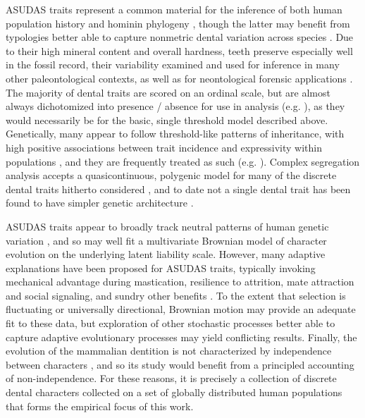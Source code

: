 \documentclass[10pt, twocolumn, twoside]{article}
\begin{document}
ASUDAS traits represent a common material for the inference of both human population history \citep{hubbardNuclearDNADental2015, rathmannReconstructingHumanPopulation2017, reyes-centenoTestingModernHuman2017} and hominin phylogeny \citep{irishDentalMorphologyPhylogenetic2013, irishAncientTeethPhenetic2018}, though the latter may benefit from typologies better able to capture nonmetric dental variation across species \citep{baileyNeandertalDentalMorphology2002, carterNewsViewsNonmetric2014}. Due to their high mineral content and overall hardness, teeth preserve especially well in the fossil record, their variability examined and used for inference in many other paleontological contexts, as well as for neontological forensic applications \citep{scottRASUDASNewWebbased2018}. The majority of dental traits are scored on an ordinal scale, but are almost always dichotomized into presence / absence for use in analysis (e.g. \citealt{irishDentalMorphologyPhylogenetic2013}), as they would necessarily be for the basic, single threshold model described above. Genetically, many appear to follow threshold-like patterns of inheritance, with high positive associations between trait incidence and expressivity within populations \citep{scottDentalMorphologyGenetic1973}, and they are frequently treated as such (e.g. \citealt{rathmannTestingUtilityDental2020}). Complex segregation analysis accepts a quasicontinuous, polygenic model for many of the discrete dental traits hitherto considered \citep{nicholComplexSegregationAnalysis1989}, and to date not a single dental trait has been found to have simpler genetic architecture \citep{scottAnthropologyModernHuman2018}. 

ASUDAS traits appear to broadly track neutral patterns of human genetic variation \citep{haniharaMorphologicalVariationMajor2008, rathmannTestingUtilityDental2020}, and so may well fit a multivariate Brownian model of character evolution on the underlying latent liability scale. However, many adaptive explanations have been proposed for ASUDAS traits, typically invoking mechanical advantage during mastication, resilience to attrition, mate attraction and social signaling, and sundry other benefits \citep{scottAnthropologyModernHuman2018}. To the extent that selection is fluctuating or universally directional, Brownian motion may provide an adequate fit to these data, but exploration of other stochastic processes better able to capture adaptive evolutionary processes may yield conflicting results. Finally, the evolution of the mammalian dentition is not characterized by independence between characters \citep{brocklehurstDentalCharactersUsed2020}, and so its study would benefit from a principled accounting of non-independence. For these reasons, it is precisely a collection of discrete dental characters collected on a set of globally distributed human populations that forms the empirical focus of this work.
\end{document}
